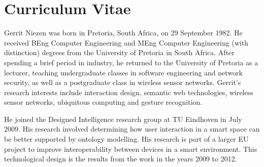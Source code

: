 \cleardoublepage
\pagestyle{empty}


\begingroup
\let\clearpage\relax
\let\cleardoublepage\relax
\let\cleardoublepage\relax

\chapter*{Curriculum Vitae}
Gerrit Niezen was born in Pretoria, South Africa, on 29 September 1982. He received BEng Computer Engineering and MEng Computer Engineering (with distinction) degrees from the University of Pretoria in South Africa. After spending a brief period in industry, he returned to the University of Pretoria as a lecturer, teaching undergraduate classes in software engineering and network security, as well as a postgraduate class in wireless sensor networks. Gerrit's research interests include interaction design, semantic web technologies, wireless sensor networks, ubiquitous computing and gesture recognition. 

He joined the Designed Intelligence research group at TU Eindhoven in July 2009. His research involved determining how user interaction in a smart space can be better supported by ontology modelling. His research is part of a larger EU project to improve interoperability between devices in a smart environment. This technological design is the results from the work in the years 2009 to 2012.

\endgroup

\vfill